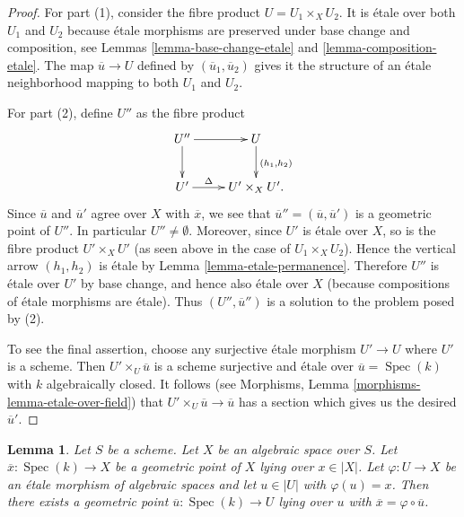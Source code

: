 \documentclass{stacks-project}
\theoremstyle{plain}
\newtheorem{lemma}[subsection]{Lemma}
\theoremstyle{definition}
\theoremstyle{remark}
\numberwithin{equation}{subsection}
\def\Spec{\mathop{\mathrm{Spec}}}
\begin{document}
\begin{proof}
For part (1), consider the fibre product $U = U_1 \times_X U_2$.
It is \'etale over both $U_1$ and $U_2$ because \'etale morphisms are
preserved under base change and composition, see
Lemmas \ref{lemma-base-change-etale} and \ref{lemma-composition-etale}.
The map $\overline{u} \to U$ defined by $(\overline{u}_1, \overline{u}_2)$
gives it the structure of an \'etale neighborhood mapping to both
$U_1$ and $U_2$.

\medskip\noindent
For part (2), define $U''$ as the fibre product
$$
\xymatrix{
U'' \ar[r] \ar[d] & U \ar[d]^{(h_1, h_2)} \\
U' \ar[r]^-\Delta & U' \times_X U'.
}
$$
Since $\overline{u}$ and $\overline{u}'$ agree over $X$ with $\overline{x}$,
we see that $\overline{u}'' = (\overline{u}, \overline{u}')$ is a geometric
point of $U''$. In particular $U'' \not = \emptyset$.
Moreover, since $U'$ is \'etale over $X$, so is the fibre product
$U'\times_X U'$ (as seen above in the case of $U_1 \times_X U_2$).
Hence the vertical arrow $(h_1, h_2)$ is \'etale by
Lemma \ref{lemma-etale-permanence}.
Therefore $U''$ is \'etale over $U'$ by base change, and hence also
\'etale over $X$ (because compositions of \'etale morphisms are \'etale).
Thus $(U'', \overline{u}'')$ is a solution to the problem posed by (2).

\medskip\noindent
To see the final assertion, choose any surjective \'etale morphism
$U' \to U$ where $U'$ is a scheme. Then
$U' \times_U \overline{u}$ is a scheme surjective and \'etale over
$\overline{u} = \Spec(k)$ with $k$ algebraically closed.
It follows (see
Morphisms, Lemma \ref{morphisms-lemma-etale-over-field})
that $U' \times_U \overline{u} \to \overline{u}$ has a section
which gives us the desired $\overline{u}'$.
\end{proof}

\begin{lemma}
\label{lemma-geometric-lift-to-usual}
Let $S$ be a scheme. Let $X$ be an algebraic space over $S$.
Let $\overline{x} : \Spec(k) \to X$ be a geometric point of $X$
lying over $x \in |X|$. Let $\varphi : U \to X$ be an \'etale morphism
of algebraic spaces and let $u \in |U|$ with $\varphi(u) = x$.
Then there exists a geometric point
$\overline{u} : \Spec(k) \to U$ lying over $u$ with
$\overline{x} = \varphi \circ \overline{u}$.
\end{lemma}
\end{document}
